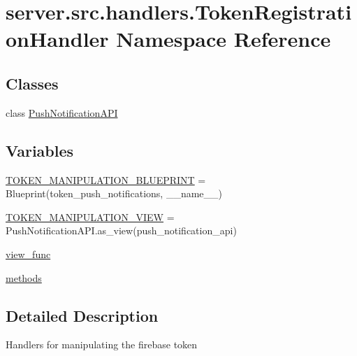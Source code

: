 \hypertarget{namespaceserver_1_1src_1_1handlers_1_1_token_registration_handler}{}\section{server.\+src.\+handlers.\+Token\+Registration\+Handler Namespace Reference}
\label{namespaceserver_1_1src_1_1handlers_1_1_token_registration_handler}
\subsection*{Classes}
\begin{DoxyCompactItemize}
\item 
class \hyperlink{classserver_1_1src_1_1handlers_1_1_token_registration_handler_1_1_push_notification_a_p_i}{Push\+Notification\+A\+PI}
\end{DoxyCompactItemize}
\subsection*{Variables}
\begin{DoxyCompactItemize}
\item 
\hyperlink{namespaceserver_1_1src_1_1handlers_1_1_token_registration_handler_abb9b47cc65096f7df55264dac650ddbb}{T\+O\+K\+E\+N\+\_\+\+M\+A\+N\+I\+P\+U\+L\+A\+T\+I\+O\+N\+\_\+\+B\+L\+U\+E\+P\+R\+I\+NT} = Blueprint(\textquotesingle{}token\+\_\+push\+\_\+notifications\textquotesingle{}, \+\_\+\+\_\+name\+\_\+\+\_\+)
\item 
\hyperlink{namespaceserver_1_1src_1_1handlers_1_1_token_registration_handler_aabeef39baf790dc67ea58a6d0389536b}{T\+O\+K\+E\+N\+\_\+\+M\+A\+N\+I\+P\+U\+L\+A\+T\+I\+O\+N\+\_\+\+V\+I\+EW} = Push\+Notification\+A\+P\+I.\+as\+\_\+view(\textquotesingle{}push\+\_\+notification\+\_\+api\textquotesingle{})
\item 
\hyperlink{namespaceserver_1_1src_1_1handlers_1_1_token_registration_handler_ad59b4d5f87e37fc111e8f3207cfcd42e}{view\+\_\+func}
\item 
\hyperlink{namespaceserver_1_1src_1_1handlers_1_1_token_registration_handler_a3891da98e217b7250037122389acb2cf}{methods}
\end{DoxyCompactItemize}


\subsection{Detailed Description}
\begin{DoxyVerb}Handlers for manipulating the firebase token\end{DoxyVerb}
 

